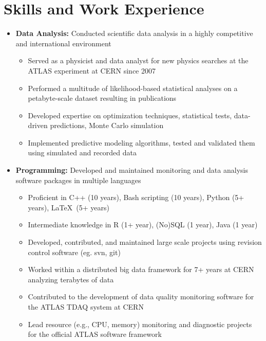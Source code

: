 \documentclass{myfancycv}
\begin{document}
\makeheader

\section{Skills and Work Experience}
\begin{itemize}

\item {\textbf{Data Analysis:} Conducted scientific data analysis in a highly competitive and international environment
{\begin{itemize}\setlength\itemindent{-2.2em}
	 \item Served as a physicist and data analyst for new physics searches at the ATLAS experiment at CERN since 2007
	 \item Performed a multitude of likelihood-based statistical analyses on a petabyte-scale dataset resulting in publications
	 \item Developed expertise on optimization techniques, statistical tests, data-driven predictions, Monte Carlo simulation
	 \item Implemented predictive modeling algorithms, tested and validated them using simulated and recorded data
\end{itemize}}%
}

\vspace{6pt}

\item {\textbf{Programming:} Developed and maintained monitoring and data analysis software packages in multiple languages
{\begin{itemize}\setlength\itemindent{-2.2em}
	\item Proficient in C++ (10 years), Bash scripting (10 years), Python (5+ years), \LaTeX\ (5+ years)
	\item Intermediate knowledge in R (1+ year), (No)SQL (1 year), Java (1 year)
	\item Developed, contributed, and maintained large scale projects using revision control software (eg. svn, git)
	\item Worked within a distributed big data framework for 7+ years at CERN analyzing terabytes of data
	\item Contributed to the development of data quality monitoring software for the ATLAS TDAQ system at CERN
	\item Lead resource (e.g., CPU, memory) monitoring and diagnostic projects for the official ATLAS software framework
\end{itemize}}%
}


\end{itemize}
\end{document}
